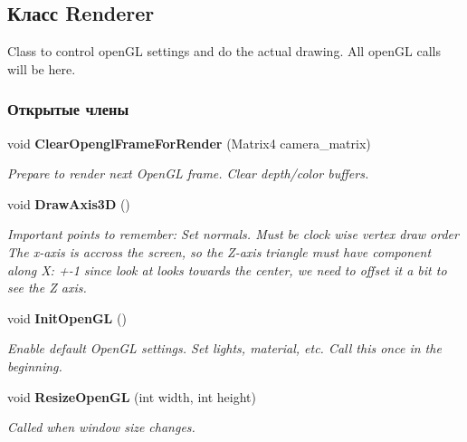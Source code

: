 \subsection{Класс Renderer}
\label{class_win_form_animation2_d_1_1_renderer}


Class to control open\+GL settings and do the actual drawing. All open\+GL calls will be here.  


\subsubsection*{Открытые члены}
\begin{DoxyCompactItemize}
\item 
void {\bf Clear\+Opengl\+Frame\+For\+Render} (Matrix4 camera\+\_\+matrix)\label{class_win_form_animation2_d_1_1_renderer_acd8d4d779a35f8f11a38b158c525cae5}

\begin{DoxyCompactList}\small\item\em Prepare to render next Open\+GL frame. Clear depth/color buffers. \end{DoxyCompactList}\item 
void {\bf Draw\+Axis3D} ()
\begin{DoxyCompactList}\small\item\em Important points to remember\+: Set normals. Must be clock wise vertex draw order The x-\/axis is accross the screen, so the Z-\/axis triangle must have component along X\+: +-\/1 since look at looks towards the center, we need to offset it a bit to see the Z axis. \end{DoxyCompactList}\item 
void {\bf Init\+Open\+GL} ()\label{class_win_form_animation2_d_1_1_renderer_a8690e89b528f55a820f4e52ab09e43c7}

\begin{DoxyCompactList}\small\item\em Enable default Open\+GL settings. Set lights, material, etc. Call this once in the beginning. \end{DoxyCompactList}\item 
void {\bf Resize\+Open\+GL} (int width, int height)\label{class_win_form_animation2_d_1_1_renderer_aeeebebac1bb2809f36e94795d29c706c}

\begin{DoxyCompactList}\small\item\em Called when window size changes. \end{DoxyCompactList}\end{DoxyCompactItemize}


